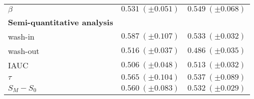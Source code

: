 \begin{table*}
{\begin{tabular}{l c c}
    \quad $\beta$     & $0.531\ (\pm 0.051)$ & $0.549\ (\pm 0.068)$ \\
    \textbf{Semi-quantitative analysis} & & \\
    \quad wash-in     & $0.587\ (\pm 0.107)$ & $0.533\ (\pm 0.032)$ \\
    \quad wash-out    & $0.516\ (\pm 0.037)$ & $0.486\ (\pm 0.035)$ \\
    \quad IAUC        & $0.506\ (\pm 0.048)$ & $0.513\ (\pm 0.032)$ \\
    \quad $\tau$      & $0.565\ (\pm 0.104)$ & $0.537\ (\pm 0.089)$ \\
    \quad $S_M - S_0$ & $0.560\ (\pm 0.083)$ & $0.532\ (\pm 0.029)$ \\
    \bottomrule
  \end{tabular}
  }
  \label{tab:resfeats}
\end{table*}

\begin{landscape}

\begin{table*}
  \caption{Coefficient of determination $R^{2}$ (i.e., $\mu \ (\pm \sigma)$), while fitting data with the different quantification models.}
  \centering
  \label{tab:r2}
\end{table*}

\end{landscape}

